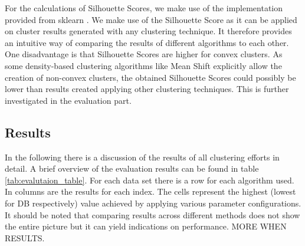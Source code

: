 For the calculations of Silhouette Scores, we make use of the implementation provided from sklearn \cite{sklearn_api}.
We make use of the Silhouette Score as it can be applied on cluster results generated with any clustering technique. It therefore provides an intuitive way of comparing the results of different algorithms to each other. One disadvantage is that Silhouette Scores are higher for convex clusters. As some density-based clustering algorithms like Mean Shift explicitly allow the creation of non-convex clusters, the obtained Silhouette Scores could possibly be lower than results created applying other clustering techniques. This is further investigated in the evaluation part. 

\subsection{Results}

In the following there is a discussion of the results of all clustering efforts in detail. A brief overview of the evaluation results can be found in table \ref{tab:evalutaion_table}. For each data set there is a row for each algorithm used. In columns are the results for each index. The cells represent the highest (lowest for \gls{DB} respectively) value achieved by applying various parameter configurations. It should be noted that comparing results across different methods does not show the entire picture but it can yield indications on performance. MORE WHEN RESULTS.

